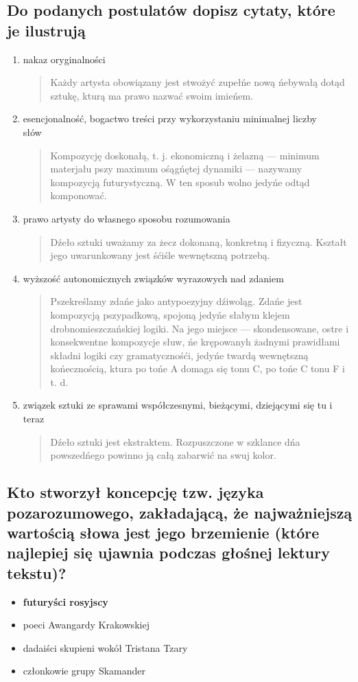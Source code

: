 \documentclass[a4paper]{article}
\begin{document}
\subsection{Do podanych postulatów dopisz cytaty, które je ilustrują}
\begin{enumerate}
    \item nakaz oryginalności \begin{quote}
        Każdy artysta obowiązany jest stwożyć zupełńe nową ńebywałą dotąd sztukę, kturą ma prawo nazwać swoim imieńem.
    \end{quote}
    \item esencjonalność, bogactwo treści przy wykorzystaniu minimalnej liczby\\ słów \begin{quote}
        Kompozycję doskonałą, t. j. ekonomiczną i żelazną — minimum materjału pszy maximum ośągńętej dynamiki — nazywamy kompozycją futurystyczną. W ten sposub wolno jedyńe odtąd komponować.
    \end{quote}
    \item prawo artysty do własnego sposobu rozumowania \begin{quote}
        Dźeło sztuki uważamy za żecz dokonaną, konkretną i fizyczną. Kształt jego uwarunkowany jest śćiśle wewnętszną potrzebą.
    \end{quote}
    \item wyższość autonomicznych związków wyrazowych nad zdaniem \begin{quote}
        Pszekreślamy zdańe jako antypoezyjny dźiwoląg. Zdańe jest kompozycją pszypadkową, spojoną jedyńe słabym klejem drobnomieszczańskiej logiki. Na jego miejsce — skondensowane, ostre i konsekwentne kompozycje słuw, ńe krępowanyh żadnymi prawidłami składni logiki czy gramatycznośći, jedyńe twardą wewnętszną końecznością, ktura po tońe A domaga się tonu C, po tońe C tonu F i t. d.
    \end{quote}
    \item związek sztuki ze sprawami współczesnymi, bieżącymi, dziejącymi się tu i teraz \begin{quote}
        Dźeło sztuki jest ekstraktem. Rozpuszczone w szklance dńa powszedńego powinno ją całą zabarwić na swuj kolor.
    \end{quote}
\end{enumerate}
\subsection{Kto stworzył koncepcję tzw. języka pozarozumowego, zakładającą, że najważniejszą wartością słowa jest je\-go brzemienie (które najlepiej się ujawnia podczas głośnej lektury tekstu)?}
\begin{itemize}
    \item \textbf{futuryści rosyjscy}
    \item poeci Awangardy Krakowskiej
    \item dadaiści skupieni wokół Tristana Tzary
    \item członkowie grupy Skamander
\end{itemize}
\end{document}
